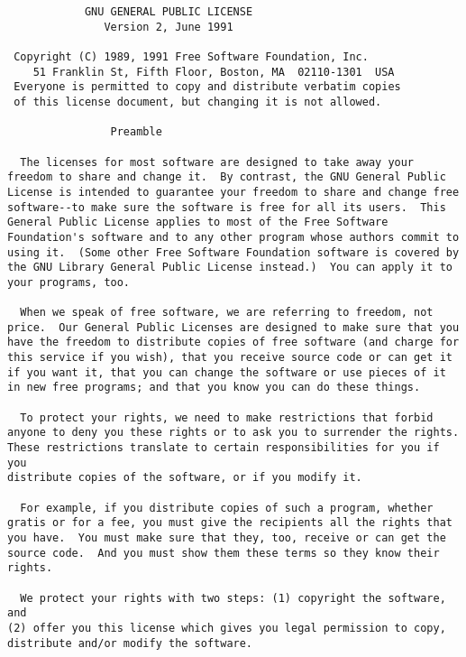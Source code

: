 \documentclass[mingoth,a4paper]{jsarticle}
\begin{document}
{{

\begin{multicols}{2}
 \begin{fontsize}{6}{6}
 \begin{verbatim}
            GNU GENERAL PUBLIC LICENSE
               Version 2, June 1991

 Copyright (C) 1989, 1991 Free Software Foundation, Inc.
    51 Franklin St, Fifth Floor, Boston, MA  02110-1301  USA
 Everyone is permitted to copy and distribute verbatim copies
 of this license document, but changing it is not allowed.

                Preamble

  The licenses for most software are designed to take away your
freedom to share and change it.  By contrast, the GNU General Public
License is intended to guarantee your freedom to share and change free
software--to make sure the software is free for all its users.  This
General Public License applies to most of the Free Software
Foundation's software and to any other program whose authors commit to
using it.  (Some other Free Software Foundation software is covered by
the GNU Library General Public License instead.)  You can apply it to
your programs, too.

  When we speak of free software, we are referring to freedom, not
price.  Our General Public Licenses are designed to make sure that you
have the freedom to distribute copies of free software (and charge for
this service if you wish), that you receive source code or can get it
if you want it, that you can change the software or use pieces of it
in new free programs; and that you know you can do these things.

  To protect your rights, we need to make restrictions that forbid
anyone to deny you these rights or to ask you to surrender the rights.
These restrictions translate to certain responsibilities for you if you
distribute copies of the software, or if you modify it.

  For example, if you distribute copies of such a program, whether
gratis or for a fee, you must give the recipients all the rights that
you have.  You must make sure that they, too, receive or can get the
source code.  And you must show them these terms so they know their
rights.

  We protect your rights with two steps: (1) copyright the software, and
(2) offer you this license which gives you legal permission to copy,
distribute and/or modify the software.


\end{verbatim}
\end{fontsize}
\end{multicols}}}
\end{document}

